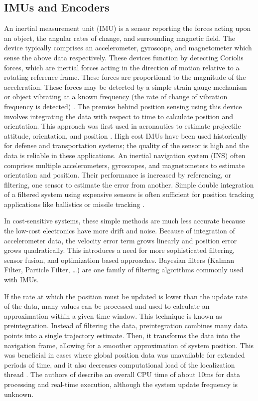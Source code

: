 \documentclass{article}
\begin{document}
  \subsection{IMUs and Encoders}
    An inertial measurement unit (IMU) is a sensor reporting the forces acting upon an object, the angular rates of change, and surrounding magnetic field. The device typically comprises an accelerometer, gyroscope, and magnetometer which sense the above data respectively. These devices function by detecting Coriolis forces, which are inertial forces acting in the direction of motion relative to a rotating reference frame. These forces are proportional to the magnitude of the acceleration. These forces may be detected by a simple strain gauge mechanism or object vibrating at a known frequency (the rate of change of vibration frequency is detected) \cite{barshan_inertial_2017}. The premise behind position sensing using this device involves integrating the data with respect to time to calculate position and orientation. This approach was first used in aeronautics to estimate projectile attitude, orientation, and position \cite{nasa_kalman_1999}. High cost IMUs have been used historically for defense and transportation systems; the quality of the sensor is high and the data is reliable in these applications. An inertial navigation system (INS) often comprises multiple accelerometers, gyroscopes, and magnetometers to estimate orientation and position. Their performance is increased by referencing, or filtering, one sensor to estimate the error from another. Simple double integration of a filtered system using expensive sensors is often sufficient for position tracking applications like ballistics or missile tracking \cite{barshan_inertial_2017}.

    In cost-sensitive systems, these simple methods are much less accurate because the low-cost electronics have more drift and noise. Because of integration of accelerometer data, the velocity error term grows linearly and position error grows quadratically. This introduces a need for more sophisticated filtering, sensor fusion, and optimization based approaches. Bayesian filters (Kalman Filter, Particle Filter, \dots) are one family of filtering algorithms commonly used with IMUs.

    If the rate at which the position must be updated is lower than the update rate of the data, many values can be processed and used to calculate an approximation within a given time window. This technique is known as preintegration. Instead of filtering the data, preintegration combines many data points into a single trajectory estimate. Then, it transforms the data into the navigation frame, allowing for a smoother approximation of system position. This was beneficial in cases where global position data was unavailable for extended periods of time, and it also decreases computational load of the localization thread \cite{lupton_visual-inertial-aided_2012}. The authors of \cite{lupton_visual-inertial-aided_2012} describe an overall CPU time of about 10ms for data processing and real-time execution, although the system update frequency is unknown. %
\end{document}
